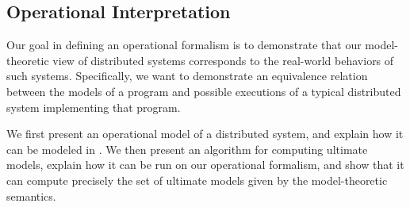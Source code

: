 

\subsection{Operational Interpretation}
\label{sec:operational}

Our goal in defining an operational formalism is to demonstrate that our model-theoretic view of distributed systems corresponds to the real-world behaviors of such systems.  Specifically, we want to demonstrate an equivalence relation between the models of a \lang program and possible executions of a typical distributed system implementing that program.  

We first present an operational model of a distributed system, and explain how it can be modeled in \lang.  We then present an algorithm for computing ultimate models, explain how it can be run on our operational formalism, and show that it can compute precisely the set of ultimate models given by the model-theoretic semantics.  


